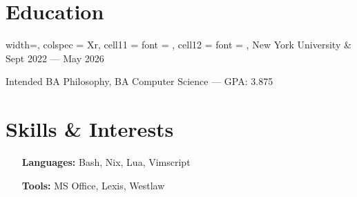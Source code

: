 \documentclass[letterpaper]{article}
\begin{document}
\section{Education}
\titlerule

\vspace{0.5em}

\begin{tblr}{
    width=\textwidth,
    colspec = {Xr},
    cell{1}{1} = {font = {\bfseries}},
    cell{1}{2} = {font = {\itshape}},
  }
  New York University & Sept 2022 --- May 2026 \\
\end{tblr}
\begin{compactitem}
  \item
    Intended BA Philosophy, BA Computer Science --- GPA: 3.875
\end{compactitem}

\vspace{0.5em}

\section{Skills \& Interests}
\titlerule

\vspace{0.5em}

\begin{itemize}
  \item[\bfseries Languages:]
    Bash, Nix, Lua, Vimscript

  \item[\bfseries Tools:]
    MS Office, Lexis, Westlaw
\end{itemize}
\end{document}

